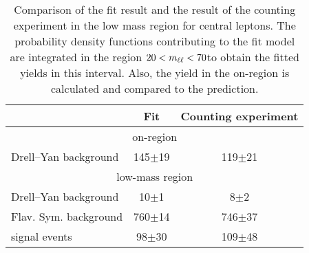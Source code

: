 
\begin{table}[hbtp]
 \renewcommand{\arraystretch}{1.3}
 \setlength{\belowcaptionskip}{6pt}
 \centering
 \caption{Comparison of the fit result and the result of the counting experiment in the low mass region for central leptons. The probability density functions contributing to the fit model are integrated in the region $20 < m_{\ell\ell} < 70$\GeV to obtain the fitted yields in this interval. Also, the yield in the on-\Z region is calculated and compared to the prediction. 
     }
  \label{tab:fitResultLowMass}
  \begin{tabular}{l| cc }
    \hline
    \hline
                                &  Fit        & Counting experiment \\ 

    \hline
    \multicolumn{3}{c}{on-\Z region} \\ 

    \hline
        Drell--Yan background       &  145$\pm$19                   & 119$\pm$21  \\

\hline
    \multicolumn{3}{c}{low-mass region} \\ 

    \hline
        Drell--Yan background       &  10$\pm$1                   & 8$\pm$2  \\
        Flav. Sym. background       &  760$\pm$14                   & 746$\pm$37  \\
        signal events       &  98$\pm$30                   & 109$\pm$48  \\

    \hline
    \hline    
  \end{tabular}
\end{table}


